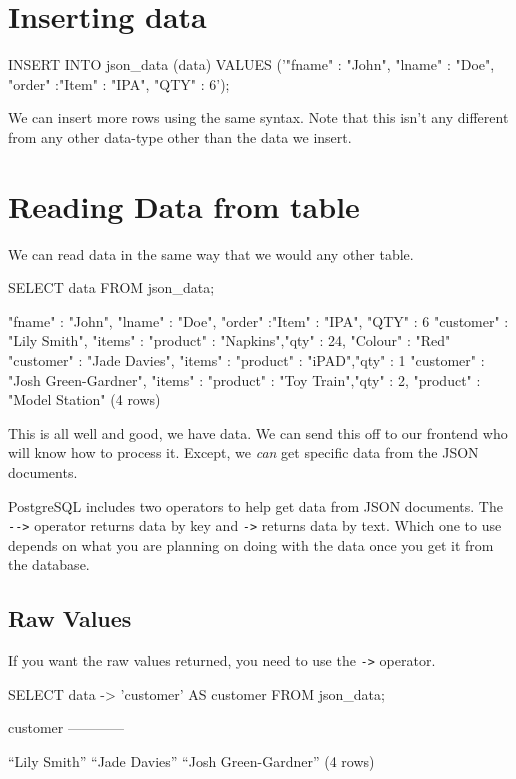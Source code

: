 \section{Inserting data}
\begin{sql}
INSERT INTO json_data (data) VALUES ('{"fname" : "John", "lname" : "Doe", "order" :{"Item" : "IPA", "QTY" : 6}}');
\end{sql}

We can insert more rows using the same syntax. Note that this isn't any different from any other data-type other than the data we insert. 

\section{Reading Data from table}
We can read data in the same way that we would any other table.
\begin{sql}
SELECT data FROM json_data;
\end{sql}
\begin{pseudo}
{"fname" : "John", "lname" : "Doe", "order" :{"Item" : "IPA", "QTY" : 6}}
{ "customer" : "Lily Smith", "items" : {"product" : "Napkins","qty" : 24, "Colour" : "Red"}}
{ "customer" : "Jade Davies", "items" : {"product" : "iPAD","qty" : 1}}
{ "customer" : "Josh Green-Gardner", "items" : {"product" : "Toy Train","qty" : 2, "product" : "Model Station"}}
(4 rows)
\end{pseudo}

This is all well and good, we have data. We can send this off to our frontend who will know how to process it. Except, we \textit{can} get specific data from the JSON documents. 

PostgreSQL includes two operators to help get data from JSON documents. The \verb|-->| operator returns data by key and \verb|->| returns data by text. Which one to use depends on what you are planning on doing with the data once you get it from the database. 

\subsection{Raw Values}
If you want the raw values returned, you need to use the \verb|->| operator. 
\begin{sql}
SELECT data -> 'customer'  AS customer FROM json_data;
\end{sql}
\begin{pseudo*}
customer
------------

“Lily Smith”
“Jade Davies”
“Josh Green-Gardner”
(4 rows)
\end{pseudo*}


